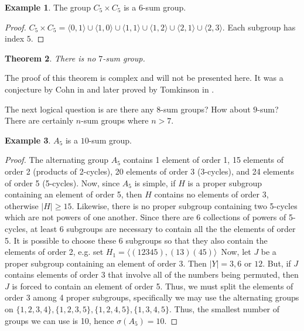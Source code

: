 \documentclass[12pt]{amsart}
\newtheorem{theorem}{Theorem}
\theoremstyle{definition}
\newtheorem{example}[theorem]{Example}
\theoremstyle{remark}
\begin{document}
\begin{example}
The group \(C_5 \times C_5\) is a \(6\)-sum group.
\end{example}
\begin{proof}
\(C_5 \times C_5 = \langle 0, 1 \rangle \cup \langle 1, 0 \rangle \cup \langle 1, 1 \rangle \cup \langle 1 , 2 \rangle \cup \langle 2, 1 \rangle \cup \langle 2, 3 \rangle\).  Each subgroup has index \(5\).
\end{proof}

\begin{theorem}
\label{th.7sum}
There is no \(7\)-sum group.
\end{theorem}

The proof of this theorem is complex and will not be presented here.  It was a conjecture by Cohn in \cite{JHCo94} and later proved by Tomkinson in \cite{MJTo97}.

The next logical question is are there any \(8\)-sum groups?  How about \(9\)-sum?  There are certainly \(n\)-sum groups where \( n > 7 \).

\begin{example}
\( A_5 \) is a \(10\)-sum group.
\end{example}
\begin{proof}
The alternating group \(A_5\) contains 1 element of order 1, 15 elements of order 2 (products of 2-cycles), 20 elements of order 3 (3-cycles),  and 24 elements of order 5 (5-cycles).  Now, since \(A_5\) is simple, if \(H\) is a proper subgroup containing an element of order 5, then \(H\) contains no elements  of order 3, otherwise \(|H| \geq 15\). Likewise, there is no proper subgroup containing two 5-cycles which are not powers of one another.  Since there are 6 collections of powers of 5-cycles, at least 6 subgroups are necessary to contain all the the elements of order 5.  It is possible to choose these 6 subgroups so that they also contain the elements of order 2, e.g. set \(H_1 = \langle (12345), (13)(45)\rangle\,\)  Now, let \(J\) be a proper subgroup containing an element of order 3. Then \(|Y| = 3, 6\) or \(12\). But, if \(J\) contains elements of order 3 that involve all of the numbers being permuted, then \(J\) is forced to contain an element of order 5.  Thus, we must split the elements of order 3 among 4 proper subgroups, specifically we may use the alternating groups on \(\{ 1, 2, 3, 4\}, \{1, 2, 3, 5\}, \{1, 2, 4, 5\}, \{1, 3, 4, 5\}\).  Thus, the smallest number of groups we can use is 10, hence \(\sigma(A_5) = 10\).
\end{proof}
\end{document}
